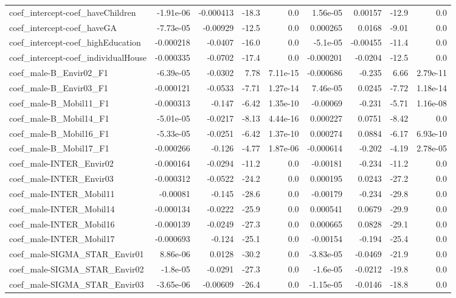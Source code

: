 \begin{tabular}{lrrrrrrrr}
coef_intercept-coef_haveChildren & -1.91e-06 & -0.000413 & -18.3 & 0.0 & 1.56e-05 & 0.00157 & -12.9 & 0.0 \\
coef_intercept-coef_haveGA & -7.73e-05 & -0.00929 & -12.5 & 0.0 & 0.000265 & 0.0168 & -9.01 & 0.0 \\
coef_intercept-coef_highEducation & -0.000218 & -0.0407 & -16.0 & 0.0 & -5.1e-05 & -0.00455 & -11.4 & 0.0 \\
coef_intercept-coef_individualHouse & -0.000335 & -0.0702 & -17.4 & 0.0 & -0.000201 & -0.0204 & -12.5 & 0.0 \\
coef_male-B_Envir02_F1 & -6.39e-05 & -0.0302 & 7.78 & 7.11e-15 & -0.000686 & -0.235 & 6.66 & 2.79e-11 \\
coef_male-B_Envir03_F1 & -0.000121 & -0.0533 & -7.71 & 1.27e-14 & 7.46e-05 & 0.0245 & -7.72 & 1.18e-14 \\
coef_male-B_Mobil11_F1 & -0.000313 & -0.147 & -6.42 & 1.35e-10 & -0.00069 & -0.231 & -5.71 & 1.16e-08 \\
coef_male-B_Mobil14_F1 & -5.01e-05 & -0.0217 & -8.13 & 4.44e-16 & 0.000227 & 0.0751 & -8.42 & 0.0 \\
coef_male-B_Mobil16_F1 & -5.33e-05 & -0.0251 & -6.42 & 1.37e-10 & 0.000274 & 0.0884 & -6.17 & 6.93e-10 \\
coef_male-B_Mobil17_F1 & -0.000266 & -0.126 & -4.77 & 1.87e-06 & -0.000614 & -0.202 & -4.19 & 2.78e-05 \\
coef_male-INTER_Envir02 & -0.000164 & -0.0294 & -11.2 & 0.0 & -0.00181 & -0.234 & -11.2 & 0.0 \\
coef_male-INTER_Envir03 & -0.000312 & -0.0522 & -24.2 & 0.0 & 0.000195 & 0.0243 & -27.2 & 0.0 \\
coef_male-INTER_Mobil11 & -0.00081 & -0.145 & -28.6 & 0.0 & -0.00179 & -0.234 & -29.8 & 0.0 \\
coef_male-INTER_Mobil14 & -0.000134 & -0.0222 & -25.9 & 0.0 & 0.000541 & 0.0679 & -29.9 & 0.0 \\
coef_male-INTER_Mobil16 & -0.000139 & -0.0249 & -27.3 & 0.0 & 0.000665 & 0.0828 & -29.1 & 0.0 \\
coef_male-INTER_Mobil17 & -0.000693 & -0.124 & -25.1 & 0.0 & -0.00154 & -0.194 & -25.4 & 0.0 \\
coef_male-SIGMA_STAR_Envir01 & 8.86e-06 & 0.0128 & -30.2 & 0.0 & -3.83e-05 & -0.0469 & -21.9 & 0.0 \\
coef_male-SIGMA_STAR_Envir02 & -1.8e-05 & -0.0291 & -27.3 & 0.0 & -1.6e-05 & -0.0212 & -19.8 & 0.0 \\
coef_male-SIGMA_STAR_Envir03 & -3.65e-06 & -0.00609 & -26.4 & 0.0 & -1.15e-05 & -0.0146 & -18.8 & 0.0 \\

\end{tabular}
